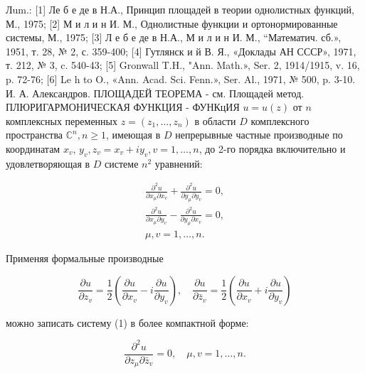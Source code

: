 \documentclass[10pt]{article}
\begin{document}
Лum.: [1] Ле б е де в Н.А., Принцип площадей в теории однолистных функций, М., 1975; [2] М и л и н И. М., Однолистные функции и ортонормированные системы, М., 1975; [3] Л е б е де в Н.А., М и л и н И. М., “Математич. сб.», 1951, т. 28, № 2, с. 359-400; [4] Гутлянск и й В. Я., «Доклады АН СССР», 1971, т. 212, № 3, c. 540-43; [5] Gronwall T.H., "Ann. Math.», Ser. 2, 1914/1915, v. 16, p. 72-76; [6] Le h to O., «Ann. Acad. Sci. Fenn.», Ser. Al., 1971, № 500, p. 3-10. И. А. Александров. ПЛОЩАДЕЙ ТЕОРЕМА - см. Площадей метод. ПЛЮРИГАРМОНИЧЕСКАЯ ФУНКЦИЯ - ФУНКцИЯ $u=u(z)$ от $n$ комплексных переменных $z=\left(z_{1}, \ldots, z_{n}\right)$ в области $D$ комплексного пространства $\mathbb{C}^{n}, n \geqslant 1$, имеющая в $D$ непрерывные частные производные по координатам $x_{v}$, $y_{v}, z_{v}=x_{v}+i y_{v}, v=1, \ldots, n$, до 2-го порядка включительно и удовлетворяющая в $D$ системе $n^{2}$ уравнений:



\[

\begin{gathered}

\frac{\partial^{2} u}{\partial x_{\mu} \partial x_{v}}+\frac{\partial^{2} u}{\partial y_{\mu} \partial y_{v}}=0, \\

\frac{\partial^{2} u}{\partial x_{\mu} \partial y_{v}}-\frac{\partial^{2} u}{\partial y_{\mu} \partial x_{v}}=0, \\

\mu, v=1, \ldots, n .

\end{gathered}

\]



Применяя формальные производные



\[

\frac{\partial u}{\partial z_{v}}=\frac{1}{2}\left(\frac{\partial u}{\partial x_{v}}-i \frac{\partial u}{\partial y_{v}}\right), \quad \frac{\partial u}{\partial \bar{z}_{v}}=\frac{1}{2}\left(\frac{\partial u}{\partial x_{v}}+i \frac{\partial u}{\partial y_{v}}\right)

\]



можно записать систему (1) в более компактной форме:



\[

\frac{\partial^{2} u}{\partial z_{\mu} \partial \bar{z}_{v}}=0, \quad \mu, v=1, \ldots, n .

\]
\end{document}
